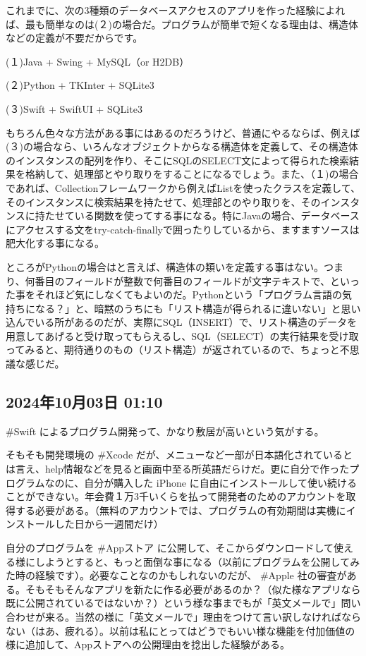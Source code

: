\documentclass[facebook_diary.tex]{subfiles}
\begin{document}
これまでに、次の3種類のデータベースアクセスのアプリを作った経験によれば、最も簡単なのは(２)の場合だ。プログラムが簡単で短くなる理由は、構造体などの定義が不要だからです。


(１)Java + Swing + MySQL（or H2DB）

(２)Python + TKInter + SQLite3

(３)Swift + SwiftUI + SQLite3


もちろん色々な方法がある事にはあるのだろうけど、普通にやるならば、例えば(３)の場合なら、いろんなオブジェクトからなる構造体を定義して、その構造体のインスタンスの配列を作り、そこにSQLのSELECT文によって得られた検索結果を格納して、処理部とやり取りをすることになるでしょう。また、（１)の場合であれば、Collectionフレームワークから例えばListを使ったクラスを定義して、そのインスタンスに検索結果を持たせて、処理部とのやり取りを、そのインスタンスに持たせている関数を使ってする事になる。特にJavaの場合、データベースにアクセスする文をtry-catch-finallyで囲ったりしているから、ますますソースは肥大化する事になる。


ところがPythonの場合はと言えば、構造体の類いを定義する事はない。つまり、何番目のフィールドが整数で何番目のフィールドが文字テキストで、といった事をそれほど気にしなくてもよいのだ。Pythonという「プログラム言語の気持ちになる？」と、暗黙のうちにも「リスト構造が得られるに違いない」と思い込んでいる所があるのだが、実際にSQL（INSERT）で、リスト構造のデータを用意してあげると受け取ってもらえるし、SQL（SELECT）の実行結果を受け取ってみると、期待通りのもの（リスト構造）が返されているので、ちょっと不思議な感じだ。

\subsection*{2024年10月03日 01:10}

\#Swift によるプログラム開発って、かなり敷居が高いという気がする。


そもそも開発環境の \#Xcode だが、メニューなど一部が日本語化されているとは言え、help情報などを見ると画面中至る所英語だらけだ。更に自分で作ったプログラムなのに、自分が購入した iPhone に自由にインストールして使い続けることができない。年会費１万3千いくらを払って開発者のためのアカウントを取得する必要がある。（無料のアカウントでは、プログラムの有効期間は実機にインストールした日から一週間だけ）


自分のプログラムを \#Appストア に公開して、そこからダウンロードして使える様にしようとすると、もっと面倒な事になる（以前にプログラムを公開してみた時の経験です）。必要なことなのかもしれないのだが、 \#Apple 社の審査がある。そもそもそんなアプリを新たに作る必要があるのか？（似た様なアプリなら既に公開されているではないか？）という様な事までもが「英文メールで」問い合わせが来る。当然の様に「英文メールで」理由をつけて言い訳しなければならない（はあ、疲れる）。以前は私にとってはどうでもいい様な機能を付加価値の様に追加して、Appストアへの公開理由を捻出した経験がある。
\end{document}
